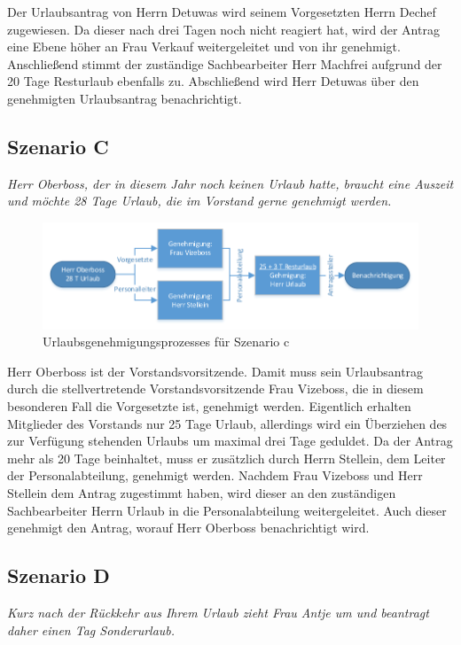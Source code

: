 Der Urlaubsantrag von Herrn Detuwas wird seinem Vorgesetzten Herrn Dechef zugewiesen. Da dieser nach drei Tagen noch nicht reagiert hat, wird der Antrag eine Ebene höher an Frau Verkauf weitergeleitet und von ihr genehmigt. Anschließend stimmt der zuständige Sachbearbeiter Herr Machfrei aufgrund der 20 Tage Resturlaub ebenfalls zu. Abschließend wird Herr Detuwas über den genehmigten Urlaubsantrag benachrichtigt.

\subsection{Szenario C}
\textit{Herr Oberboss, der in diesem Jahr noch keinen Urlaub hatte, braucht eine Auszeit und möchte 28 Tage Urlaub, die im Vorstand gerne genehmigt werden.}

\begin{figure}[H]
\centering
\includegraphics[width=1.0\linewidth]{Bilder/BeispielC}
\caption{Urlaubsgenehmigungsprozesses für Szenario c}
\label{fig:BeispielC}
\end{figure}

Herr Oberboss ist der Vorstandsvorsitzende. Damit muss sein Urlaubsantrag durch die stellvertretende Vorstandsvorsitzende Frau Vizeboss, die in diesem besonderen Fall die Vorgesetzte ist, genehmigt werden. Eigentlich erhalten Mitglieder des Vorstands nur 25 Tage Urlaub, allerdings wird ein Überziehen des zur Verfügung stehenden Urlaubs um maximal drei Tage geduldet. Da der Antrag mehr als 20 Tage beinhaltet, muss er zusätzlich durch Herrn Stellein, dem Leiter der Personalabteilung, genehmigt werden. Nachdem Frau Vizeboss und Herr Stellein dem Antrag zugestimmt haben, wird dieser an den zuständigen Sachbearbeiter Herrn Urlaub in die Personalabteilung weitergeleitet. Auch dieser genehmigt den Antrag, worauf Herr Oberboss benachrichtigt wird.

\subsection{Szenario D}
\textit{Kurz nach der Rückkehr aus Ihrem Urlaub zieht Frau Antje um und beantragt daher einen Tag Sonderurlaub.}

